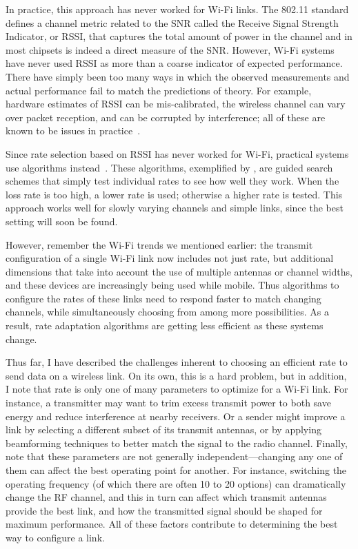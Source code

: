 In practice, this approach has never worked for Wi-Fi links. The 802.11 standard defines a channel metric related to the SNR called the Receive Signal Strength Indicator, or RSSI, that captures the total amount of power in the channel and in most chipsets is indeed a direct measure of the SNR. However, Wi-Fi systems have never used RSSI as more than a coarse indicator of expected performance. There have simply been too many ways in which the observed measurements and actual performance fail to match the predictions of theory. For example, hardware estimates of RSSI can be mis-calibrated, the wireless channel can vary over packet reception, and can be corrupted by interference; all of these are known to be issues in practice~\cite{Camp_rateadapt,Judd_CHARM,Reis_interference}.

Since rate selection based on RSSI has never worked for Wi-Fi, practical systems use  algorithms instead~\cite{Bicket_SampleRate,Minstrel,Wong_RRAA}. These algorithms, exemplified by , are guided search schemes that simply test individual rates to see how well they work. When the loss rate is too high, a lower rate is used; otherwise a higher rate is tested. This approach works well for slowly varying channels and simple links, since the best setting will soon be found.

However, remember the Wi-Fi trends we mentioned earlier: the transmit configuration of a single Wi-Fi link now includes not just rate, but additional dimensions that take into account the use of multiple antennas or channel widths, and these devices are increasingly being used while mobile. Thus algorithms to configure the rates of these links need to respond faster to match changing channels, while simultaneously choosing from among more possibilities. As a result, rate adaptation algorithms are getting less efficient as these systems change.

Thus far, I have described the challenges inherent to choosing an efficient rate to send data on a wireless link. On its own, this is a hard problem, but in addition, I note that rate is only one of many parameters to optimize for a Wi-Fi link. For instance, a transmitter may want to trim excess transmit power to both save energy and reduce interference at nearby receivers. Or a sender might improve a link by selecting a different subset of its transmit antennas, or by applying beamforming techniques to better match the signal to the radio channel. Finally, note that these parameters are not generally independent---changing any one of them can affect the best operating point for another. For instance, switching the operating frequency (of which there are often 10 to 20 options) can dramatically change the RF channel, and this in turn can affect which transmit antennas provide the best link, and how the transmitted signal should be shaped for maximum performance. All of these factors contribute to determining the best way to configure a link.

